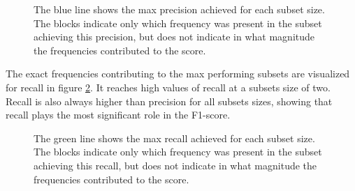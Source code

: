        \begin{figure}[H]
            \centering
            
            \caption[Best frequency combination - Precision]{The blue line shows the max precision achieved for each subset size. The blocks indicate only which frequency was present in the subset achieving this precision, but does not indicate in what magnitude the frequencies contributed to the score.}
          	\medskip 
            \label{increasing_freq_precision_score_fig}
        \end{figure}
        
    The exact frequencies contributing to the max performing subsets are visualized for recall in figure \ref{increasing_freq_recall_score_fig}. It reaches high values of recall at a subsets size of two. Recall is also always higher than precision for all subsets sizes, showing that recall plays the most significant role in the F1-score.
    
    
        \begin{figure}[H]
            \centering
            
            \caption[Best frequency combination - Recall]{The green line shows the max recall achieved for each subset size. The blocks indicate only which frequency was present in the subset achieving this recall, but does not indicate in what magnitude the frequencies contributed to the score.}
          	\medskip 
            \label{increasing_freq_recall_score_fig}
        \end{figure}

